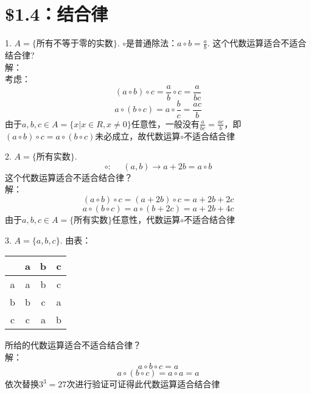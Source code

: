 \documentclass{ctexart}
\begin{document}
\section*{\$1.4：结合律}
1. $A=\{$所有不等于零的实数$\}$. $\circ$是普通除法：$a \circ b = \frac{a}{b}$. 这个代数运算适合不适合结合律? \\
解：\\
考虑：
\begin{equation*}
	(a \circ b)\circ c = \frac{a}{b} \circ c = \frac{a}{bc} 
\end{equation*}
\begin{equation*}
	a \circ (b \circ c) = a \circ \frac{b}{c} = \frac{ac}{b} 
\end{equation*}
由于$a,b,c \in A=\{x | x \in R,x \neq 0\}$任意性，一般没有$\frac{a}{bc}=\frac{ac}{b}$，即
$(a \circ b)\circ c=a \circ (b \circ c)$未必成立，故代数运算$\circ$不适合结合律 

2. $A=\{$所有实数$\}$. \\
\begin{equation*}
	\circ: \ \ \ \ \ \ (a,b) \rightarrow a+2b = a \circ b
\end{equation*}
\noindent
这个代数运算适合不适合结合律？\\
解：\\
\begin{equation*}
	(a \circ b)\circ c = (a+2b) \circ c = a+2b+2c 
\end{equation*}
\begin{equation*}
	a \circ (b \circ c) = a \circ (b+2c) = a+2b+4c 
\end{equation*}
由于$a,b,c \in A=\{$所有实数$\}$任意性，代数运算$\circ$不适合结合律

3. $A=\{a,b,c\}$. 由表：\\
\begin{center}
\begin{tabular}{c|ccc}
	  & a & b & c \\
	\hline
	a & a & b & c \\
	b & b & c & a \\
	c & c & a & b \\
\end{tabular} 
\end{center}
所给的代数运算适合不适合结合律？\\
解： \\
\begin{equation*}
	a \circ b \circ c = a 
\end{equation*}
\begin{equation*}
	a \circ (b \circ c) = a \circ a = a
\end{equation*}
依次替换$3^3=27$次进行验证可证得此代数运算适合结合律
\end{document}

